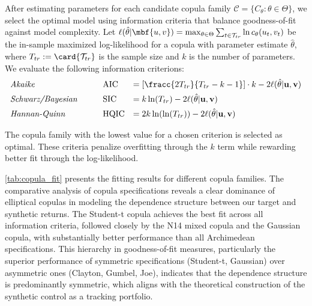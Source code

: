 After estimating parameters for each candidate copula family $\mathcal{C} = \{C_\theta : \theta \in \Theta\}$, we select the optimal model using information criteria that balance goodness-of-fit against model complexity. Let $\ell(\hat{\theta}|\mbf {u,v}) = \max_{\theta\in\Theta} \sum_{t\in\mathcal T_{tr}} \ln c_{{\theta}}(u_t, v_t)$ be the in-sample maximized log-likelihood for a copula with parameter estimate $\hat{\theta}$, where $T_{tr}:=\card{\mathcal T_{tr}}$ is the sample size and $k$ is the number of parameters. We evaluate the following information criterions:
$$
\begin{array}{lllll}
\text{\textit{Akaike}} &&& \text{AIC} &= [\fracc{2T_{tr}}{T_{tr}-k-1}] \cdot k - 2\ell(\hat{\theta}|\mathbf{u,v})
\\[0.44em]
\text{\textit{Schwarz/Bayesian}} &&& \text{SIC} &= k\ln(T_{tr}) - 2\ell(\hat{\theta}|\mathbf{u,v})
\\[0.44em]
\text{\textit{Hannan-Quinn}} &&& \text{HQIC} &= 2k\ln(\ln(T_{tr})) - 2\ell(\hat{\theta}|\mathbf{u,v})
\end{array}
$$

The copula family with the lowest value for a chosen criterion is selected as optimal. These criteria penalize overfitting through the $k$ term while rewarding better fit through the log-likelihood.





\cref{tab:copula_fit} presents the fitting results for different copula families.  The comparative analysis of copula specifications reveals a clear dominance of elliptical copulas in modeling the dependence structure between  our target and synthetic returns. The Student-t copula achieves the best fit across all information criteria, %
followed closely by the N14 mixed copula and the Gaussian copula, with substantially better performance than all Archimedean specifications. This hierarchy in goodness-of-fit measures, particularly the superior performance of symmetric specifications (Student-t, Gaussian) over asymmetric ones (Clayton, Gumbel, Joe), indicates that the dependence structure is predominantly symmetric, which aligns with the theoretical construction of the synthetic control as a tracking portfolio.

